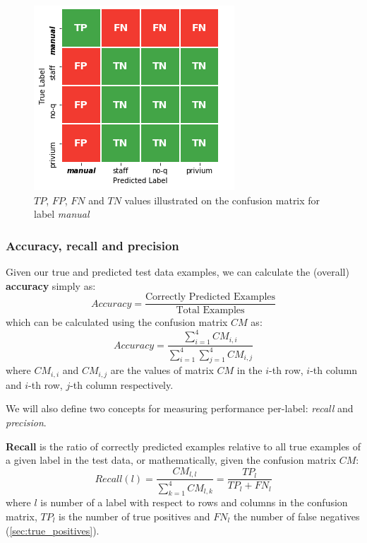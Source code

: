 \begin{figure}[H]
    \centering
    \includegraphics[width=.4\textwidth]{Pictures/manual_tp_fn_tn_example.png}
    \caption{$TP$, $FP$, $FN$ and $TN$ values illustrated on the confusion matrix for label \textit{manual}}
    \label{fig:manual_tp_fn_tn_etc_example}
\end{figure}

\subsubsection{Accuracy, recall and precision}
Given our true and predicted test data examples, we can calculate the (overall) \textbf{accuracy} simply as:
\begin{equation*}
    Accuracy = \frac{\text{Correctly Predicted Examples}}{\text{Total Examples}}
\end{equation*}
which can be calculated using the confusion matrix $CM$ as:
\begin{equation*}
    Accuracy = \frac{\sum\limits_{i=1}^{4} CM_{i,i}}{\sum\limits_{i=1}^{4}\sum\limits_{j=1}^{4} CM_{i,j}}
\end{equation*}
where $CM_{i,i}$ and $CM_{i,j}$ are the values of matrix $CM$ in the $i$-th row, $i$-th column and $i$-th row, $j$-th column respectively.\par
\medskip
\par
We will also define two concepts for measuring performance per-label: \textit{recall} and \textit{precision}.
\medskip
\par
\textbf{Recall} is the ratio of correctly predicted examples relative to all true examples of a given label in the test data, or mathematically, given the confusion matrix $CM$:  
\begin{equation*}
    Recall(l) = \frac{CM_{l,l}}{\sum\limits_{k=1}^{4} CM_{l,k}} = \frac{TP_l}{TP_l+FN_l}
\end{equation*}
where $l$ is number of a label with respect to rows and columns in the confusion matrix, $TP_l$ is the number of true positives and $FN_l$ the number of false negatives (\cref{sec:true_positives}).

